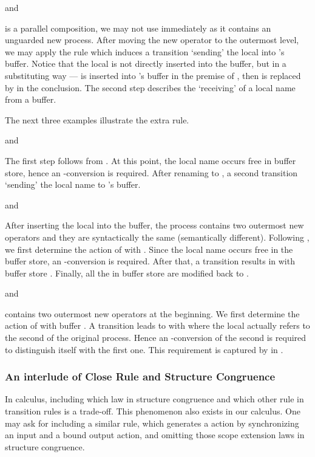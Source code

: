 \documentclass[runningheads, envcountsame, a4paper]{llncs}
\begin{document}
\begin{example}
 and 

\end{example}

 is a parallel composition, we may not use  immediately as it contains an unguarded new process.
After moving the new operator to the outermost level, we may apply the  rule
which induces a  transition `sending' the local  into 's buffer.
Notice that the local  is not directly inserted into the buffer, but in a substituting way ---
 is inserted into 's buffer in the premise of , then  is replaced by  in the conclusion.
The second  step describes the `receiving' of a local name from a buffer.

The next three examples illustrate the extra  rule.
\begin{example}
 and 

\end{example}
The first  step follows from .
At this point, the local name  occurs free in buffer store, hence an -conversion is required.
After renaming  to , a second  transition `sending' the local name to 's buffer.

\begin{example}
 and 

\end{example}
After inserting the local  into the buffer, the process contains two outermost new operators
and they are syntactically the same (semantically different).
Following , we first determine the action of  with .
Since the local name  occurs free in the buffer store, an -conversion is required.
After that, a  transition results in  with buffer store .
Finally, all the  in buffer store are modified back to .

\begin{example}
 and 


\end{example}
 contains two outermost new operators at the beginning.
We first determine the action of  with buffer .
A  transition leads to  with 
where the local  actually refers to the second  of the original process.
Hence an -conversion of the second  is required to distinguish itself with the first one.
This requirement is captured by  in .



\subsubsection{An interlude of Close Rule and Structure Congruence}
In  calculus, including which law in structure congruence and which other rule in transition rules is a trade-off. This phenomenon also exists in our  calculus. One may ask for including a similar  rule, which generates a  action by synchronizing an input and a bound output action, and omitting those scope extension laws in structure congruence.
\end{document}
